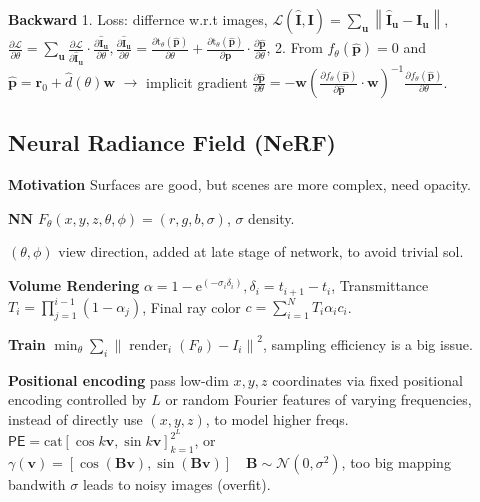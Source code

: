 \textbf{Backward}
1. Loss: differnce w.r.t images, \(\mathcal{L}(\hat{\mathbf{I}}, \mathbf{I})=\sum_{\mathbf{u}}\left\|\hat{\mathbf{I}}_{\mathbf{u}}-\mathbf{I}_{\mathbf{u}}\right\|\),
% 
\(\frac{\partial \mathcal{L}}{\partial \theta}=\sum_{\mathbf{u}} \frac{\partial \mathcal{L}}{\partial \hat{\mathbf{I}}_{\mathbf{u}}} \cdot \frac{\partial \hat{\mathbf{I}}_{\mathbf{u}}}{\partial \theta},
% 
\frac{\partial \hat{\mathbf{I}}_{\mathbf{u}}}{\partial \theta}=\frac{\partial \mathrm{t}_{\theta}(\widehat{\mathbf{p}})}{\partial \theta}+\frac{\partial \mathrm{t}_{\theta}(\widehat{\mathbf{p}})}{\partial \widehat{\mathbf{p}}} \cdot \frac{\partial \widehat{\mathbf{p}}}{\partial \theta}\),
2. From \(f_{\theta}(\widehat{\mathbf{p}})=0\) and \(\widehat{\mathbf{p}}=\mathbf{r}_{0}+\hat{d}(\theta) \mathbf{w}\) \(\to\) implicit gradient \(\frac{\partial \widehat{\mathbf{p}}}{\partial \theta}=-\mathbf{w}\left(\frac{\partial f_{\theta}(\widehat{\mathbf{p}})}{\partial \widehat{\mathbf{p}}} \cdot \mathbf{w}\right)^{-1} \frac{\partial f_{\theta}(\widehat{\mathbf{p}})}{\partial \theta}\).


\subsection*{Neural Radiance Field (NeRF)}
\textbf{Motivation} Surfaces are good, but scenes are more complex, need opacity.

\textbf{NN} \(F_\theta(x,y, z, \theta, \phi) = (r,g,b, \sigma)\), \(\sigma\) density.

\((\theta, \phi)\) view direction, added at late stage of network, to avoid trivial sol.


\textbf{Volume Rendering}
% 
\(\alpha=1-\mathrm{e}^{\left(-\sigma_{i} \delta_{i}\right)}, \delta_{i}=t_{i+1}-t_{i}\), Transmittance \(T_{i}=\prod_{j=1}^{i-1}\left(1-\alpha_{j}\right)\), Final ray color \(c=\sum_{i=1}^{N} {T_{i} \alpha_{i}} c_{i}\).

\textbf{Train} \(\min _{\theta} \sum_{i}\left\|\operatorname{render}_{i}\left(F_{\theta}\right)-I_{i}\right\|^{2}\), sampling efficiency is a big issue.

\textbf{Positional encoding} pass low-dim \(x,y,z\) coordinates via fixed positional encoding controlled by \(L\) or random Fourier features of varying frequencies, instead of directly use \((x,y,z)\), to model higher freqs.
% 
\(\mathsf{PE} = \text{cat}[\cos k\mathbf{v}, \sin k\mathbf{v}]_{k=1}^{2^L}\), 
% 
or \(\gamma(\mathbf{v})=[\cos (\mathbf{B v}), \sin (\mathbf{B v})] \quad \mathbf{B} \sim \mathcal{N}\left(0, \sigma^{2}\right)\), too big mapping bandwith  \(\sigma\) leads to noisy images (overfit).
